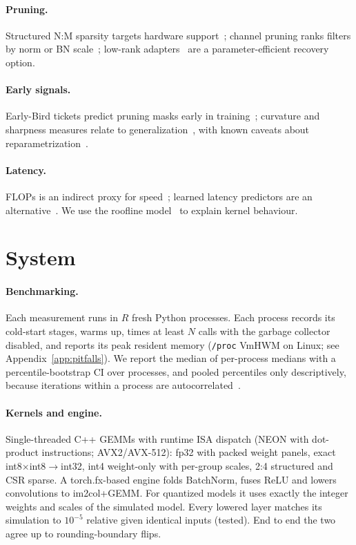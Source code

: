 \documentclass[10pt]{article}
\begin{document}
\paragraph{Pruning.} Structured N:M sparsity targets hardware
support~\citep{mishra2021accelerating,zhou2021nm}; channel pruning ranks filters by norm or
BN scale~\citep{li2017pruning,liu2017slimming}; low-rank adapters~\citep{hu2022lora} are a
parameter-efficient recovery option.
\paragraph{Early signals.} Early-Bird tickets predict pruning masks early in
training~\citep{you2020earlybird}; curvature and sharpness measures relate to
generalization~\citep{yao2020pyhessian,jiang2020fantastic}, with known caveats about
reparametrization~\citep{dinh2017sharp}.
\paragraph{Latency.} FLOPs is an indirect proxy for speed~\citep{ma2018shufflenetv2}; learned
latency predictors are an alternative~\citep{zhang2021nnmeter}. We use the roofline
model~\citep{williams2009roofline} to explain kernel behaviour.

\section{System}
\paragraph{Benchmarking.} Each measurement runs in $R$ fresh Python processes. Each process
records its cold-start stages, warms up, times at least $N$ calls with the garbage collector
disabled, and reports its peak resident memory (\texttt{/proc} VmHWM on Linux; see
Appendix~\ref{app:pitfalls}). We report the median of per-process medians with a
percentile-bootstrap CI over processes, and pooled percentiles only descriptively, because
iterations within a process are autocorrelated~\citep{kalibera2013rigorous,mytkowicz2009wrong}.
\paragraph{Kernels and engine.} Single-threaded C++ GEMMs with runtime ISA dispatch (NEON with
dot-product instructions; AVX2/AVX-512): fp32 with packed weight panels, exact
int8$\times$int8$\rightarrow$int32, int4 weight-only with per-group scales, 2:4 structured
and CSR sparse. A torch.fx-based engine folds BatchNorm, fuses ReLU and lowers convolutions to
im2col+GEMM. For quantized models it uses exactly the integer weights and scales of the
simulated model. Every lowered layer matches its simulation to $10^{-5}$ relative given
identical inputs (tested). End to end the two agree up to rounding-boundary flips.
\end{document}

